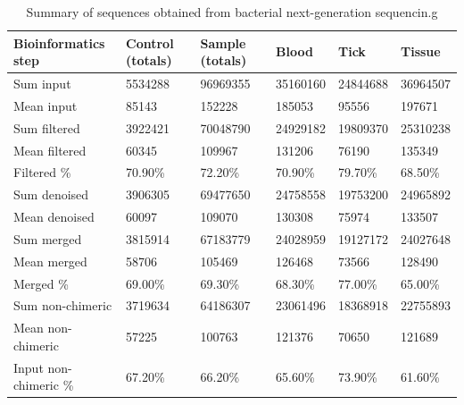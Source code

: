 \documentclass[a4paper, nobind]{templates/ociamthesis}
\begin{document}
\begin{table}[!h]

\caption[Summary of sequences obtained from bacterial amplicon sequencing.]{\label{tab:TA31}Summary of sequences obtained from bacterial next-generation sequencin.g}
\centering
\fontsize{8.5}{10.5}\selectfont
\begin{tabular}[t]{llllll}
\toprule
Bioinformatics step & Control (totals) & Sample (totals) & Blood & Tick & Tissue\\
\midrule
Sum input & 5534288 & 96969355 & 35160160 & 24844688 & 36964507\\
Mean input & 85143 & 152228 & 185053 & 95556 & 197671\\
Sum filtered & 3922421 & 70048790 & 24929182 & 19809370 & 25310238\\
Mean filtered & 60345 & 109967 & 131206 & 76190 & 135349\\
Filtered \% & 70.90\% & 72.20\% & 70.90\% & 79.70\% & 68.50\%\\
Sum denoised & 3906305 & 69477650 & 24758558 & 19753200 & 24965892\\
Mean denoised & 60097 & 109070 & 130308 & 75974 & 133507\\
Sum merged & 3815914 & 67183779 & 24028959 & 19127172 & 24027648\\
Mean merged & 58706 & 105469 & 126468 & 73566 & 128490\\
Merged \% & 69.00\% & 69.30\% & 68.30\% & 77.00\% & 65.00\%\\
Sum non-chimeric & 3719634 & 64186307 & 23061496 & 18368918 & 22755893\\
Mean non-chimeric & 57225 & 100763 & 121376 & 70650 & 121689\\
Input non-chimeric \% & 67.20\% & 66.20\% & 65.60\% & 73.90\% & 61.60\%\\
\bottomrule
\end{tabular}
\end{table}

\newpage
\end{document}
